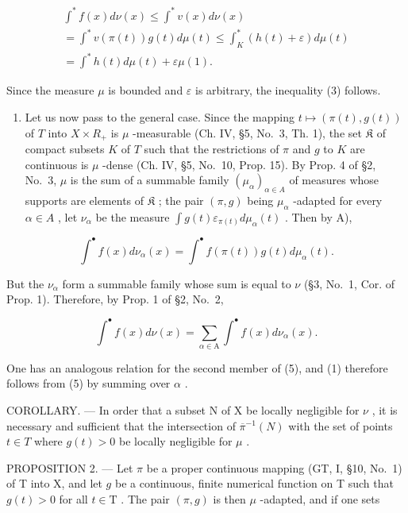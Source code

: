 \[
\begin{array}{l} \int^ {*} f (x) d \nu (x) \leqslant \int^ {*} v (x) d \nu (x) \\ = \int^ {*} v (\pi (t)) g (t) d \mu (t) \leqslant \int_ {K} ^ {*} (h (t) + \varepsilon) d \mu (t) \\ = \int^ {*} h (t) d \mu (t) + \varepsilon \mu (1). \end{array}\tag{4}
\]

Since the measure \(\mu\) is bounded and \(\varepsilon\) is arbitrary, the inequality (3) follows.

\begin{enumerate}
\def\labelenumi{\Alph{enumi})}
\setcounter{enumi}{1}
\tightlist
\item
  Let us now pass to the general case. Since the mapping \(t \mapsto (\pi(t), g(t))\) of \(T\) into \(X \times R_{+}\) is \(\mu\) -measurable (Ch. IV, §5, No.~3, Th. 1), the set \(\mathfrak{K}\) of compact subsets \(K\) of \(T\) such that the restrictions of \(\pi\) and \(g\) to \(K\) are continuous is \(\mu\) -dense (Ch. IV, §5, No.~10, Prop. 15). By Prop. 4 of §2, No.~3, \(\mu\) is the sum of a summable family \((\mu_{\alpha})_{\alpha \in A}\) of measures whose supports are elements of \(\mathfrak{K}\) ; the pair \((\pi, g)\) being \(\mu_{\alpha}\) -adapted for every \(\alpha \in A\) , let \(\nu_{\alpha}\) be the measure \(\int g(t)\varepsilon_{\pi(t)} d\mu_{\alpha}(t)\) . Then by A),
\end{enumerate}

\[
\int^ {\bullet} f (x) d \nu_ {\alpha} (x) = \int^ {\bullet} f (\pi (t)) g (t) d \mu_ {\alpha} (t).\tag{5}
\]

But the \(\nu_{\alpha}\) form a summable family whose sum is equal to \(\nu\) (§3, No.~1, Cor. of Prop. 1). Therefore, by Prop. 1 of §2, No.~2,

\[
\int^ {\bullet} f (x) d \nu (x) = \sum_ {\alpha \in \mathrm{A}} \int^ {\bullet} f (x) d \nu_ {\alpha} (x).\tag{6}
\]

One has an analogous relation for the second member of (5), and (1) therefore follows from (5) by summing over \(\alpha\) .

COROLLARY. --- In order that a subset N of X be locally negligible for \(\nu\) , it is necessary and sufficient that the intersection of \(\overline{\pi}^{-1}(N)\) with the set of points \(t \in T\) where \(g(t) > 0\) be locally negligible for \(\mu\) .

PROPOSITION 2. --- Let \(\pi\) be a proper continuous mapping (GT, I, §10, No.~1) of T into X, and let \(g\) be a continuous, finite numerical function on T such that \(g(t) > 0\) for all \(t \in \mathrm{T}\) . The pair \((\pi, g)\) is then \(\mu\) -adapted, and if one sets

